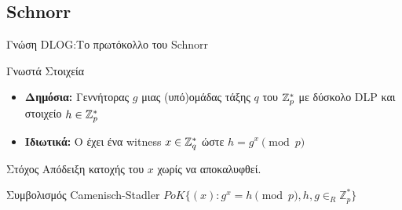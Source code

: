 \documentclass[handout]{beamer}
\begin{document}
\subsection{Schnorr}
\begin{frame}[allowframebreaks]{Γνώση DLOG:Το πρωτόκολλο του Schnorr}
\begin{block}{Γνωστά Στοιχεία}
\begin{itemize}
\item \textbf{Δημόσια:} Γεννήτορας $g$ μιας (υπό)ομάδας τάξης $q$ του $\mathbb{Z}^*_{p}$ με δύσκολο DLP και στοιχείο $h \in \mathbb{Z}^*_{p}$ 
\item \textbf{Ιδιωτικά:} O \prv έχει ένα witness $x \in \mathbb{Z}^*_{q}$ ώστε $h = g^x \pmod{p}$
\end{itemize}
\end{block}

\begin{block}{Στόχος}
Απόδειξη κατοχής του $x$ χωρίς να αποκαλυφθεί.
\end{block}

\begin{block}{Συμβολισμός Camenisch-Stadler}
$PoK \{(x): g^x = h \pmod{p}, h,g \in_R \mathbb{Z}_p^* \}$ 
\end{block}

\framebreak


\end{frame}
\end{document}
